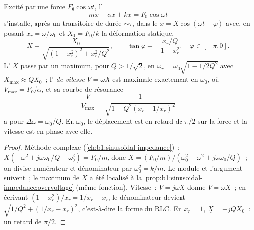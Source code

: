 \begin{theorem}\label{thm:b1:oscillators-resonance:forced}
Excité par une force $F_0\cos\omega t$, l'
\[
m\ddot x + \alpha\dot x + kx = F_0\cos\omega t
\]
s'installe, après un transitoire de durée $\sim\tau$, dans le  $x = X\cos(\omega t + \varphi)$ avec, en posant $x_r = \omega/\omega_0$
et $X_0 = F_0/k$ la déformation statique,
\[
X = \frac{X_0}{\sqrt{(1 - x_r^2)^2 + x_r^2/Q^2}}, \qquad
\tan\varphi = -\frac{x_r/Q}{1 - x_r^2}, \quad \varphi \in [-\pi, 0] .
\]
L'\emph{} $X$ passe par un maximum, pour $Q > 1/\sqrt2$, en $\omega_r =
\omega_0\sqrt{1 - 1/2Q^2}$ avec $X_{\max} \approx QX_0$~; l'\emph{
de vitesse} $V = \omega X$ est maximale exactement en $\omega_0$, où $V_{\max} =
F_0/\alpha$, et sa courbe de résonance
\[
\frac{V}{V_{\max}} = \frac{1}{\sqrt{1 + Q^2(x_r - 1/x_r)^2}}
\]
a pour  $\Delta\omega = \omega_0/Q$. En $\omega_0$, le
déplacement est en retard de $\pi/2$ sur la force et la vitesse est en
phase avec elle.
\end{theorem}

\begin{proof}
Méthode complexe (\cref{ch:b1:sinusoidal-impedance})~: $\underline X(-\omega^2
+ j\omega\omega_0/Q + \omega_0^2) = F_0/m$, donc $\underline X = (F_0/m)/(\omega_0^2
- \omega^2 + j\omega\omega_0/Q)$~; on divise numérateur et dénominateur
par $\omega_0^2 = k/m$. Le module et l'argument suivent~; le maximum de
$X$ a été localisé à la \cref{prop:b1:sinusoidal-impedance:overvoltage}
(même fonction). Vitesse~: $\underline V = j\omega\underline X$ donne $V = \omega X$~;
en écrivant $(1 - x_r^2)/x_r = 1/x_r - x_r$, le dénominateur devient
$\sqrt{1/Q^2 + (1/x_r - x_r)^2}$, c'est-à-dire la forme du RLC. En $x_r = 1$,
$\underline X = -jQX_0$~: un retard de $\pi/2$.
\end{proof}

